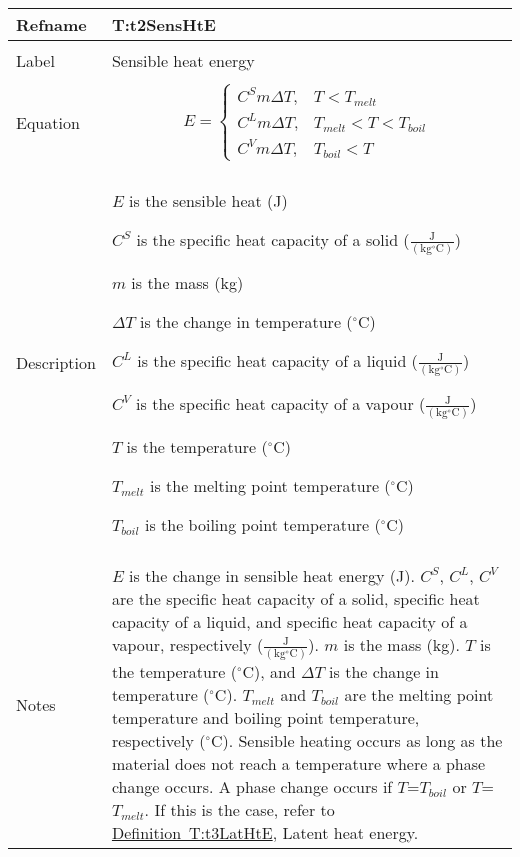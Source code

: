 \documentclass[12pt]{article}
\begin{document}
~\newline
\noindent \begin{minipage}{\textwidth}
\begin{tabular}{p{} p{}}
\toprule \textbf{Refname} & \textbf{T:t2SensHtE}
\label{T:t2SensHtE}
\\ \midrule \\
Label & Sensible heat energy
\\ \midrule \\
Equation & \begin{dmath}
           E=\begin{cases}
{C^{S}} m ΔT, & T<{T_{melt}}\\
{C^{L}} m ΔT, & {T_{melt}}<T<{T_{boil}}\\
{C^{V}} m ΔT, & {T_{boil}}<T
\end{cases}
           \end{dmath}
\\ \midrule \\
Description & \begin{symbDescription}
              \item{$E$ is the sensible heat (J)}
              \item{${C^{S}}$ is the specific heat capacity of a solid ($\frac{\text{J}}{(\text{kg}{}^{\circ}\text{C})}$)}
              \item{$m$ is the mass (kg)}
              \item{$ΔT$ is the change in temperature (${}^{\circ}$C)}
              \item{${C^{L}}$ is the specific heat capacity of a liquid ($\frac{\text{J}}{(\text{kg}{}^{\circ}\text{C})}$)}
              \item{${C^{V}}$ is the specific heat capacity of a vapour ($\frac{\text{J}}{(\text{kg}{}^{\circ}\text{C})}$)}
              \item{$T$ is the temperature (${}^{\circ}$C)}
              \item{${T_{melt}}$ is the melting point temperature (${}^{\circ}$C)}
              \item{${T_{boil}}$ is the boiling point temperature (${}^{\circ}$C)}
              \end{symbDescription}
\\ \midrule \\
Notes & $E$ is the change in sensible heat energy (J). ${C^{S}}$, ${C^{L}}$, ${C^{V}}$ are the specific heat capacity of a solid, specific heat capacity of a liquid, and specific heat capacity of a vapour, respectively ($\frac{\text{J}}{(\text{kg}{}^{\circ}\text{C})}$). $m$ is the mass (kg). $T$ is the temperature (${}^{\circ}$C), and $ΔT$ is the change in temperature (${}^{\circ}$C). ${T_{melt}}$ and ${T_{boil}}$ are the melting point temperature and boiling point temperature, respectively (${}^{\circ}$C). Sensible heating occurs as long as the material does not reach a temperature where a phase change occurs. A phase change occurs if $T$=${T_{boil}}$ or $T$=${T_{melt}}$. If this is the case, refer to \hyperref[T:t3LatHtE]{Definition~T:t3LatHtE}, Latent heat energy.

\end{tabular}
\end{minipage}
\end{document}
